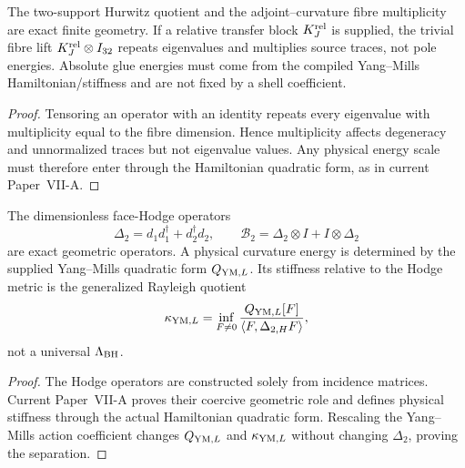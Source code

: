 \documentclass[12pt,a4paper]{article}
\begin{document}
\begin{theorem}
\label{p11:thm:geometric-pure-glue-relative-block-corrected}

The two-support Hurwitz quotient and the adjoint--curvature fibre multiplicity are exact finite geometry.  If a relative transfer block \(K_J^{\rm rel}\) is supplied, the trivial fibre lift \(K_J^{\rm rel}\otimes I_{32}\) repeats eigenvalues and multiplies source traces, not pole energies.  Absolute glue energies must come from the compiled Yang--Mills Hamiltonian/stiffness and are not fixed by a shell coefficient.
\label{p11:eq:ss-relative-primitive-energies-corrected}
\label{p11:eq:primitive-glue-relative-representatives-corrected}
\label{p11:eq:curvature-fibre-transfer-tensor-product}
\end{theorem}
\begin{proof}

Tensoring an operator with an identity repeats every eigenvalue with multiplicity equal to the fibre dimension.  Hence multiplicity affects degeneracy and unnormalized traces but not eigenvalue values.  Any physical energy scale must therefore enter through the Hamiltonian quadratic form, as in current Paper~VII-A.
\end{proof}

\begin{theorem}
\label{p11:thm:finite-plaquette-hodge-curvature-hessian}
\label{p11:thm:bilinear-curvature-heat-time}

The dimensionless face-Hodge operators
\[
\Delta_2=d_1d_1^\dagger+d_2^\dagger d_2,
\qquad
\mathcal B_2=\Delta_2\otimes I+I\otimes\Delta_2
\]
are exact geometric operators.  A physical curvature energy is determined by the supplied Yang--Mills quadratic form \(Q_{\mathrm{YM},L}\).  Its stiffness relative to the Hodge metric is the generalized Rayleigh quotient
\[
\kappa_{\mathrm{YM},L}=\inf_{F\ne0}\frac{Q_{\mathrm{YM},L}[F]}{\langle F,\Delta_{2,H}F\rangle},
\]
not a universal \(\Lambda_{\rm BH}\).
\label{p11:eq:face-hodge-curvature-operator}
\label{p11:eq:bilinear-curvature-hessian}
\label{p11:eq:curvature-stiffness-kappa-lambdabh}
\end{theorem}
\begin{proof}

The Hodge operators are constructed solely from incidence matrices.  Current Paper~VII-A proves their coercive geometric role and defines physical stiffness through the actual Hamiltonian quadratic form.  Rescaling the Yang--Mills action coefficient changes \(Q_{\mathrm{YM},L}\) and \(\kappa_{\mathrm{YM},L}\) without changing \(\Delta_2\), proving the separation.
\end{proof}
\end{document}
